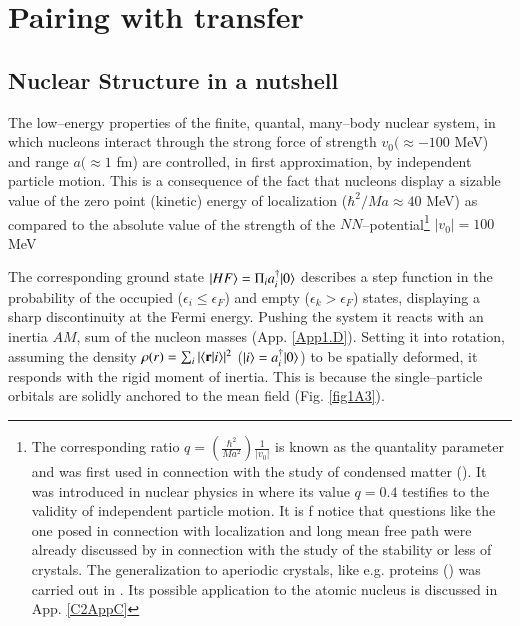 \chapter{Pairing with transfer}\label{chapter1}
\section{Nuclear Structure in a nutshell}\label{C1S1}
The low--energy properties of the finite, quantal, many--body nuclear system, in which nucleons interact through the strong force of strength $v_0(\approx -100$ MeV) and range $a(\approx 1$ fm) are controlled, in first approximation, by independent particle motion. This is a consequence of the fact that nucleons display a sizable value of the zero point (kinetic) energy of localization ($\hbar^2/Ma\approx 40$ MeV) as compared to the absolute value of the strength of the $NN$--potential\footnote{The corresponding ratio $q=\left(\frac{\hbar^2}{Ma^2}\right)\frac{1}{|v_0|}$ is known as the quantality parameter and was first used in connection with the study of condensed matter (\cite{deBoer:48,deBoer:57,deBoer:48b,Nosanow:76}). It was introduced in nuclear physics in \cite{Mottelson:02} where its value $q=0.4$ testifies to the validity of independent particle motion. It is f notice that questions like the one posed in connection with localization and long mean free path were already discussed by \cite{Lindemann:10} in connection with the study of the stability or less of crystals. The generalization to aperiodic crystals, like e.g. proteins (\cite{Schrodinger:44}) was carried out in \cite{Stillinger:90}. Its possible application to the atomic nucleus is discussed in App. \ref{C2AppC} } $|v_0|=100$ MeV 

The corresponding ground state $|{HF} \rangle=\Pi_ia^\dagger_i|{0} \rangle$ describes a step function in the probability of the occupied ($\epsilon_i\leq \epsilon_F$) and empty ($\epsilon_k>\epsilon_F$) states, displaying a sharp discontinuity at the Fermi energy. Pushing the system it reacts with an inertia $AM$, sum of the nucleon masses (App. \ref{App1.D}). Setting it into rotation, assuming the density $\rho(r)=\sum_i|\langle {\mathbf r|i} \rangle|^2$ ($|{i} \rangle=a^\dagger_i|{0} \rangle$) to be spatially deformed, it responds with the rigid moment of inertia. This is because the single--particle orbitals are solidly anchored to the mean field (Fig. \ref{fig1A3}).

